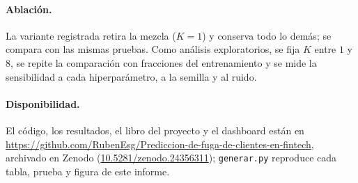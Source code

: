 \paragraph{Ablación.}
La variante registrada retira la mezcla ($K = 1$) y conserva todo lo demás; se compara con las mismas pruebas. Como
análisis exploratorios, se fija $K$ entre $1$ y $8$, se repite la comparación con fracciones del entrenamiento y se
mide la sensibilidad a cada hiperparámetro, a la semilla y al ruido.

\paragraph{Disponibilidad.}
El código, los resultados, el libro del proyecto y el dashboard están en
\url{https://github.com/RubenEsg/Prediccion-de-fuga-de-clientes-en-fintech}, archivado en Zenodo
(\href{https://doi.org/10.5281/zenodo.24356311}{10.5281/zenodo.24356311}); \texttt{generar.py} reproduce cada tabla,
prueba y figura de este informe.
